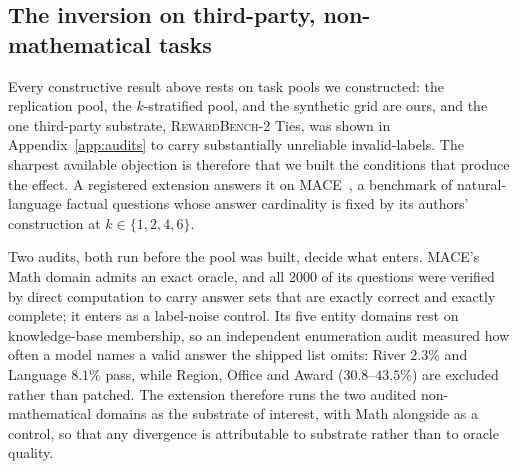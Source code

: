 \documentclass[11pt]{article}
\begin{document}
\FloatBarrier
\subsection{The inversion on third-party, non-mathematical tasks}
\label{sec:mace}

Every constructive result above rests on task pools we constructed: the replication pool, the $k$-stratified pool, and the synthetic grid are ours, and the one third-party substrate, \textsc{RewardBench-2} Ties, was shown in Appendix~\ref{app:audits} to carry substantially unreliable invalid-labels.
The sharpest available objection is therefore that we built the conditions that produce the effect.
A registered extension answers it on \textsc{MACE}~\cite{mace2026}, a benchmark of natural-language factual questions whose answer cardinality is fixed by its authors' construction at $k \in \{1,2,4,6\}$.

Two audits, both run before the pool was built, decide what enters.
\textsc{MACE}'s Math domain admits an exact oracle, and all 2000 of its questions were verified by direct computation to carry answer sets that are exactly correct and exactly complete; it enters as a label-noise control.
Its five entity domains rest on knowledge-base membership, so an independent enumeration audit measured how often a model names a valid answer the shipped list omits: River $2.3\%$ and Language $8.1\%$ pass, while Region, Office and Award ($30.8$--$43.5\%$) are excluded rather than patched.
The extension therefore runs the two audited non-mathematical domains as the substrate of interest, with Math alongside as a control, so that any divergence is attributable to substrate rather than to oracle quality.
\end{document}
